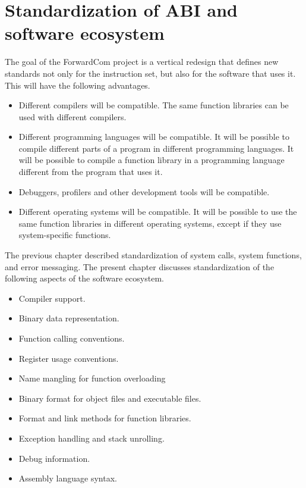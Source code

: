 \documentclass[forwardcom.tex]{subfiles}
\begin{document}
\RaggedRight

\chapter{Standardization of ABI and software ecosystem} \label{StandardizationOfAbi}
The goal of the ForwardCom project is a vertical redesign that defines new standards not only for the instruction set, but also for the software that uses it. This will have the following advantages.

\begin{itemize}
\item Different compilers will be compatible. The same function libraries can be used with different compilers. 

\item Different programming languages will be compatible. It will be possible to compile different parts of a program in different programming languages. It will be possible to compile a function library in a programming language different from the program that uses it. 

\item Debuggers, profilers and other development tools will be compatible. 

\item Different operating systems will be compatible. It will be possible to use the same function libraries in different operating systems, except if they use system-specific functions. 
\end{itemize}

The previous chapter described standardization of system calls, system functions, and error messaging. The present chapter discusses standardization of the following aspects of the software ecosystem. 

\begin{itemize}
\item Compiler support. 

\item Binary data representation. 

\item Function calling conventions. 

\item Register usage conventions.

\item Name mangling for function overloading

\item Binary format for object files and executable files.

\item Format and link methods for function libraries.

\item Exception handling and stack unrolling.

\item Debug information.

\item Assembly language syntax. 

\end{itemize}
\end{document}
